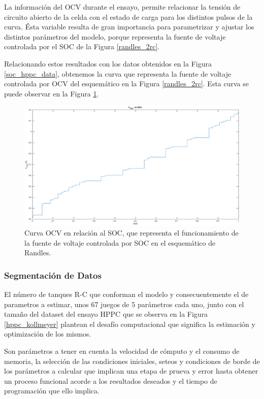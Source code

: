 \documentclass[10pt, a4paper]{report}
\begin{document}
La informaci\'on del \acrshort{OCV} durante el ensayo, permite relacionar la
tensi\'on de circuito abierto de la celda con el estado de carga para los
distintos pulsos de la curva. \'Esta variable resulta de gran importancia para
parametrizar y ajustar los distintos par\'ametros del modelo, porque representa
la fuente de voltaje controlada por el \acrshort{SOC} de la Figura
\ref{randles_2rc}.

Relacionando estos resultados con los datos obtenidos en la Figura 
\ref{soc_hppc_data}, obtenemos la curva que representa la fuente de voltaje
controlada por \acrshort{OCV} del esquem\'atico en la Figura \ref{randles_2rc}.
Esta curva se puede observar en la Figura \ref{fig:ocv_vs_soc}.

\begin{figure}[h!]
    \begin{center}
        \includegraphics[width=.7\textwidth]{ocv_vs_soc.eps}
        \caption{Curva \acrshort{OCV} en relaci\'on al \acrshort{SOC}, que
            representa el funcionamiento de la fuente de voltaje controlada por
        \acrshort{SOC} en el esquem\'atico de Randles.}
        \label{fig:ocv_vs_soc}
    \end{center}
\end{figure}
\FloatBarrier

\subsubsection{Segmentaci\'on de Datos}\label{flank_seg}

El número de tanques R-C que conforman el modelo y consecuentemente el de
parametros a estimar, unos 67 juegos de 5 parámetros cada uno, junto con el
tamaño del dataset del ensayo \acrshort{HPPC} que se observa en la Figura
\ref{hppc_kollmeyer} plantean el desafío computacional que significa la
estimación y optimización de los mismos. 

Son parámetros a tener en cuenta la velocidad de cómputo y el consumo de
memoria, la selección de las condiciones iniciales, seteos y condiciones de
borde de los parámetros a calcular que implican una etapa de
prueva y error hasta obtener un proceso funcional acorde a los resultados
deseados y el tiempo de programación que ello implica.
\end{document}
